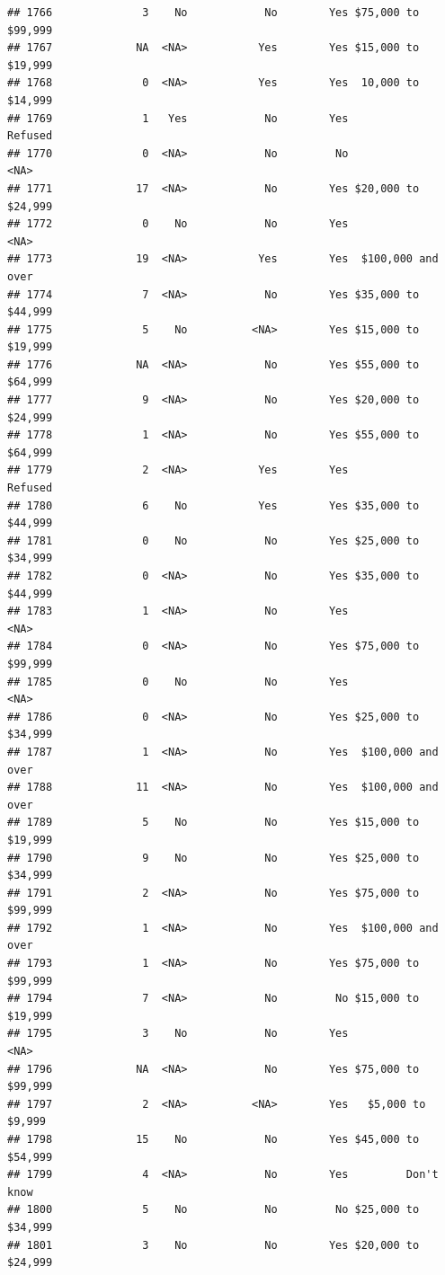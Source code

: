 \documentclass[man]{apa6}
\begin{document}
\begin{verbatim}
## 1766              3    No            No        Yes $75,000 to $99,999
## 1767             NA  <NA>           Yes        Yes $15,000 to $19,999
## 1768              0  <NA>           Yes        Yes  10,000 to $14,999
## 1769              1   Yes            No        Yes            Refused
## 1770              0  <NA>            No         No               <NA>
## 1771             17  <NA>            No        Yes $20,000 to $24,999
## 1772              0    No            No        Yes               <NA>
## 1773             19  <NA>           Yes        Yes  $100,000 and over
## 1774              7  <NA>            No        Yes $35,000 to $44,999
## 1775              5    No          <NA>        Yes $15,000 to $19,999
## 1776             NA  <NA>            No        Yes $55,000 to $64,999
## 1777              9  <NA>            No        Yes $20,000 to $24,999
## 1778              1  <NA>            No        Yes $55,000 to $64,999
## 1779              2  <NA>           Yes        Yes            Refused
## 1780              6    No           Yes        Yes $35,000 to $44,999
## 1781              0    No            No        Yes $25,000 to $34,999
## 1782              0  <NA>            No        Yes $35,000 to $44,999
## 1783              1  <NA>            No        Yes               <NA>
## 1784              0  <NA>            No        Yes $75,000 to $99,999
## 1785              0    No            No        Yes               <NA>
## 1786              0  <NA>            No        Yes $25,000 to $34,999
## 1787              1  <NA>            No        Yes  $100,000 and over
## 1788             11  <NA>            No        Yes  $100,000 and over
## 1789              5    No            No        Yes $15,000 to $19,999
## 1790              9    No            No        Yes $25,000 to $34,999
## 1791              2  <NA>            No        Yes $75,000 to $99,999
## 1792              1  <NA>            No        Yes  $100,000 and over
## 1793              1  <NA>            No        Yes $75,000 to $99,999
## 1794              7  <NA>            No         No $15,000 to $19,999
## 1795              3    No            No        Yes               <NA>
## 1796             NA  <NA>            No        Yes $75,000 to $99,999
## 1797              2  <NA>          <NA>        Yes   $5,000 to $9,999
## 1798             15    No            No        Yes $45,000 to $54,999
## 1799              4  <NA>            No        Yes         Don't know
## 1800              5    No            No         No $25,000 to $34,999
## 1801              3    No            No        Yes $20,000 to $24,999

\end{verbatim}
\end{document}
